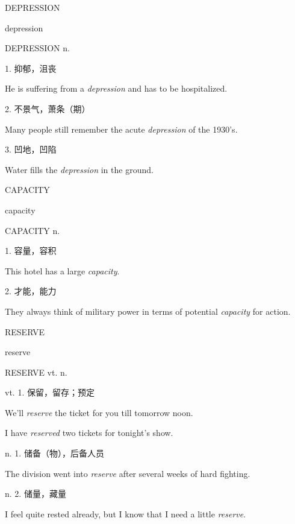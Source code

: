 \begin{flashcard}{
DEPRESSION

depression
}
\begin{center}
DEPRESSION n. 
\end{center}
1. 抑郁，沮丧

He is suffering from a \textit{depression} and has to be hospitalized.

2. 不景气，萧条（期）

Many people still remember the acute \textit{depression} of the 1930's.

3. 凹地，凹陷

Water fills the \textit{depression} in the ground.

\end{flashcard}
\begin{flashcard}{
CAPACITY

capacity
}
\begin{center}
CAPACITY n. 
\end{center}
1. 容量，容积

This hotel has a large \textit{capacity}.

2. 才能，能力

They always think of military power in terms of potential \textit{capacity} for action.

\end{flashcard}
\begin{flashcard}{
RESERVE

reserve
}
\begin{center}
RESERVE vt. n. 
\end{center}
vt. 1. 保留，留存；预定

We'll \textit{reserve} the ticket for you till tomorrow noon.

I have \textit{reserved} two tickets for tonight's show.

n. 1. 储备（物），后备人员

The division went into \textit{reserve} after several weeks of hard fighting.

n. 2. 储量，藏量

I feel quite rested already, but I know that I need a little \textit{reserve}.

\end{flashcard}
